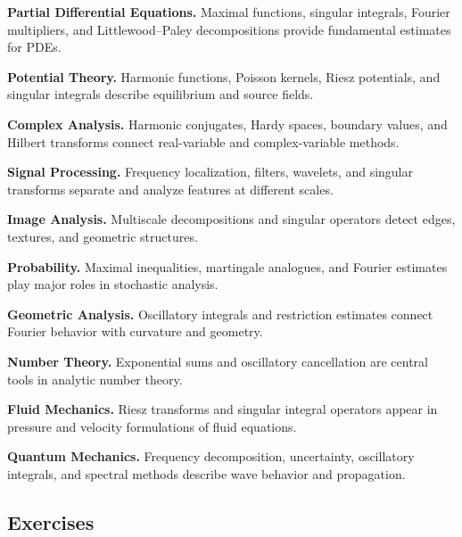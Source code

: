 \begin{applicationbox}
\textbf{Partial Differential Equations.}
Maximal functions, singular integrals, Fourier multipliers, and
Littlewood--Paley decompositions provide fundamental estimates for PDEs.

\medskip

\textbf{Potential Theory.}
Harmonic functions, Poisson kernels, Riesz potentials, and singular
integrals describe equilibrium and source fields.

\medskip

\textbf{Complex Analysis.}
Harmonic conjugates, Hardy spaces, boundary values, and Hilbert transforms
connect real-variable and complex-variable methods.

\medskip

\textbf{Signal Processing.}
Frequency localization, filters, wavelets, and singular transforms
separate and analyze features at different scales.

\medskip

\textbf{Image Analysis.}
Multiscale decompositions and singular operators detect edges, textures,
and geometric structures.

\medskip

\textbf{Probability.}
Maximal inequalities, martingale analogues, and Fourier estimates play
major roles in stochastic analysis.

\medskip

\textbf{Geometric Analysis.}
Oscillatory integrals and restriction estimates connect Fourier behavior
with curvature and geometry.

\medskip

\textbf{Number Theory.}
Exponential sums and oscillatory cancellation are central tools in
analytic number theory.

\medskip

\textbf{Fluid Mechanics.}
Riesz transforms and singular integral operators appear in pressure and
velocity formulations of fluid equations.

\medskip

\textbf{Quantum Mechanics.}
Frequency decomposition, uncertainty, oscillatory integrals, and spectral
methods describe wave behavior and propagation.
\end{applicationbox}

\subsection{Exercises}
\label{subsec:harmonic-analysis-exercises}

